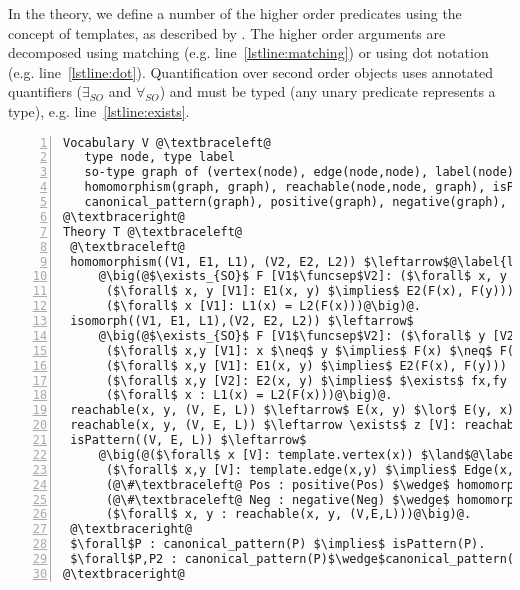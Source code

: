 In the theory, we define a number of the higher order predicates using the concept of templates, as described by \cite{DBLP:journals/tplp/DassevilleHJD15}. %
The higher order arguments are decomposed using matching (e.g. line~\ref{lstline:matching}) or using dot notation (e.g. line~\ref{lstline:dot}).
Quantification over second order objects uses annotated quantifiers ($\exists_{SO}$ and $\forall_{SO}$) and must be typed (any unary predicate represents a type), e.g. line~\ref{lstline:exists}.

\newcommand{\funcsep}[0]{:}
\begin{lstlisting}[mathescape,style=model,caption={Faithful encoding for the general graph mining problem},label=lst:faithful, numbers=left]
Vocabulary V @\textbraceleft@
   type node, type label
   so-type graph of (vertex(node), edge(node,node), label(node):label)
   homomorphism(graph, graph), reachable(node,node, graph), isPattern(graph),
   canonical_pattern(graph), positive(graph), negative(graph), template:graph 
@\textbraceright@ 
Theory T @\textbraceleft@ 
 @\textbraceleft@
 homomorphism((V1, E1, L1), (V2, E2, L2)) $\leftarrow$@\label{lstline:matching}@
     @\big(@$\exists_{SO}$ F [V1$\funcsep$V2]: ($\forall$ x, y [V1]: x $\neq$ y $\implies$ F(x) $\neq$ F(y)) $\wedge$@\label{lstline:exists}@
      ($\forall$ x, y [V1]: E1(x, y) $\implies$ E2(F(x), F(y))) $\wedge$
      ($\forall$ x [V1]: L1(x) = L2(F(x)))@\big)@.
 isomorph((V1, E1, L1),(V2, E2, L2)) $\leftarrow$
     @\big(@$\exists_{SO}$ F [V1$\funcsep$V2]: ($\forall$ y [V2]: $\exists$ x [V1]: F(x)=y) $\land$ 
      ($\forall$ x,y [V1]: x $\neq$ y $\implies$ F(x) $\neq$ F(y)) $\wedge$
      ($\forall$ x,y [V1]: E1(x, y) $\implies$ E2(F(x), F(y))) $\wedge$              
      ($\forall$ x,y [V2]: E2(x, y) $\implies$ $\exists$ fx,fy [V1]: E1(fx, fy) $\land$ x = F(fx) $\land$ y = F(fy))$\wedge$ 
      ($\forall$ x : L1(x) = L2(F(x)))@\big)@.
 reachable(x, y, (V, E, L)) $\leftarrow$ E(x, y) $\lor$ E(y, x).
 reachable(x, y, (V, E, L)) $\leftarrow \exists$ z [V]: reachable(x, z, (V, E, L)) $\wedge$ reachable(z, y, (V, E, L)).
 isPattern((V, E, L)) $\leftarrow$
     @\big(@($\forall$ x [V]: template.vertex(x)) $\land$@\label{lstline:dot}@
      ($\forall$ x,y [V]: template.edge(x,y) $\implies$ Edge(x,y)) $\land$ 
      (@\#\textbraceleft@ Pos : positive(Pos) $\wedge$ homomorphism((V,E,L), Pos) @\textbraceright@ $\geq$ $N_{+}$) $\land$
      (@\#\textbraceleft@ Neg : negative(Neg) $\wedge$ homomorphism((V,E,L), Neg) @\textbraceright@ $\leq$ $N_{-}$) $\land$
      ($\forall$ x, y : reachable(x, y, (V,E,L)))@\big)@. 
 @\textbraceright@
 $\forall$P : canonical_pattern(P) $\implies$ isPattern(P). 
 $\forall$P,P2 : canonical_pattern(P)$\wedge$canonical_pattern(P2)$\wedge$P$\neq$P2 $\implies$ $\neg$isomorph(P, P2).
@\textbraceright@ 
\end{lstlisting}


